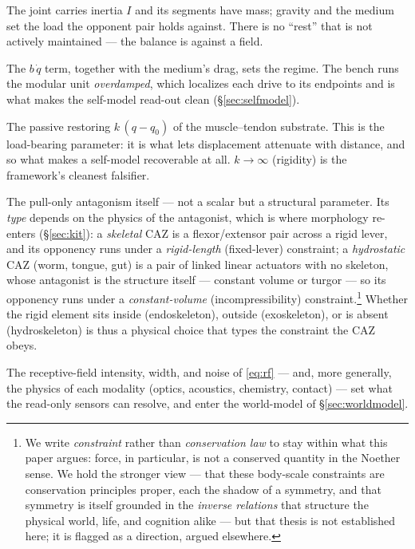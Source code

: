 \documentclass{article}
\begin{document}
\begin{description}[itemsep=3pt,labelindent=0pt,leftmargin=2em,
                    style=nextline]
\item[Gravity and mass ($g$, $m$, $I$).]
The joint carries inertia $I$ and its segments have mass; gravity and
the medium set the load the opponent pair holds against.  There is no
``rest'' that is not actively maintained --- the balance is against a
field.
\item[Friction and damping ($b$).]
The $b\,\dot q$ term, together with the medium's drag, sets the
regime.  The bench runs the modular unit \emph{overdamped}, which localizes
each drive to its endpoints and is what makes the self-model read-out
clean (\S\ref{sec:selfmodel}).
\item[Elasticity ($k$).]
The passive restoring $k\,(q-q_0)$ of the muscle--tendon substrate.
This is the load-bearing parameter: it is what lets displacement
attenuate with distance, and so what makes a self-model recoverable at
all.  $k\to\infty$ (rigidity) is the framework's cleanest falsifier.
\item[Opponency.]
The pull-only antagonism itself --- not a scalar but a structural
parameter.  Its \emph{type} depends on the physics of the antagonist,
which is where morphology re-enters (\S\ref{sec:kit}): a
\emph{skeletal} CAZ is a flexor/extensor pair across a rigid lever, and
its opponency runs under a \emph{rigid-length} (fixed-lever) constraint;
a \emph{hydrostatic} CAZ (worm, tongue, gut) is a pair of linked linear
actuators with no skeleton, whose antagonist is the structure itself ---
constant volume or turgor --- so its opponency runs under a
\emph{constant-volume} (incompressibility) constraint.\footnote{We write
\emph{constraint} rather than \emph{conservation law} to stay within what
this paper argues: force, in particular, is not a conserved quantity in
the Noether sense.  We hold the stronger view --- that these body-scale
constraints are conservation principles proper, each the shadow of a
symmetry, and that symmetry is itself grounded in the \emph{inverse
relations} that structure the physical world, life, and cognition alike
\citep{Nagarjuna1994_Inversion,GN2005_TowardsModelLifeCognition} --- but
that thesis is not established here; it is flagged as a direction, argued
elsewhere.}  Whether the rigid element sits inside (endoskeleton),
outside (exoskeleton), or is absent (hydroskeleton) is thus a physical
choice that types the constraint the CAZ obeys.
\item[Transducer physics ($I$, $\sigma$, $\eta$).]
The receptive-field intensity, width, and noise of \eqref{eq:rf} ---
and, more generally, the physics of each modality (optics, acoustics,
chemistry, contact) --- set what the read-only sensors can resolve, and
enter the world-model of \S\ref{sec:worldmodel}.
\end{description}
\end{document}
